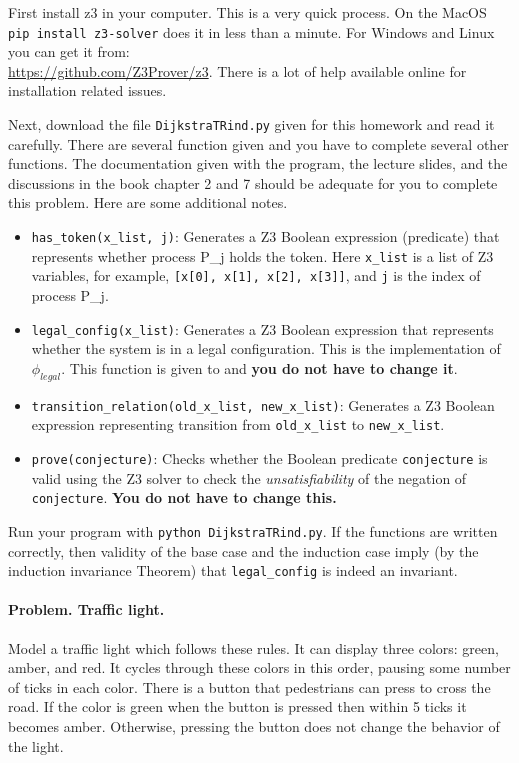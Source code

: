 \documentclass[11pt]{article}
\begin{document}
First install z3 in your computer. This is a very quick process. On the MacOS \texttt{pip install z3-solver} does it in less than a minute. For Windows and Linux you can get it from: \\  \href{https://github.com/Z3Prover/z3}{https://github.com/Z3Prover/z3}. There is a lot of help available online for installation related issues. 

Next, download the file \texttt{DijkstraTRind.py} given for this homework and read it carefully. There are several function given and you have to complete several other functions. The documentation given with the program, the lecture slides, and the discussions in the book chapter 2 and 7 should be adequate for you to complete this problem. Here are some additional notes. 

\begin{itemize}
\item \texttt{has\_token(x\_list, j)}: Generates a Z3 Boolean expression (predicate) that represents whether process P\_j holds the token. Here  \texttt{x\_list} is a list of Z3 variables, for example, \texttt{[x[0], x[1], x[2], x[3]]}, and  \texttt{j} is the index of process P\_j.
\item \texttt{legal\_config(x\_list)}: Generates a Z3 Boolean expression that represents whether the system is in a legal configuration. This is the implementation of $\phi_{\mathit{legal}}$. This function is given to and {\bf you do not have to change it\/}.
%
\item \texttt{transition\_relation(old\_x\_list, new\_x\_list)}: Generates a Z3 Boolean expression representing transition from \texttt{old\_x\_list} to \texttt{new\_x\_list}.
\item \texttt{prove(conjecture)}: Checks whether the Boolean predicate \texttt{conjecture} is valid using the Z3 solver to check the {\em unsatisfiability\/} of the negation of \texttt{conjecture}. {\bf You do not have to change this.\/}
\end{itemize}

Run your program with \texttt{python DijkstraTRind.py}. If the functions are written correctly, then validity of the base case and the induction case imply (by the induction invariance Theorem) that \texttt{legal\_config} is indeed an invariant.

\paragraph{Problem. Traffic light.} 
 Model a traffic light which follows these rules. It can display three colors: green, amber, and red. It cycles through these colors in this order, pausing some number of ticks in each color. There is a button that pedestrians can press to cross the road. If the color is green when the button is pressed then within 5 ticks it becomes amber. Otherwise, pressing the button does not change the behavior of the light.
\end{document}
